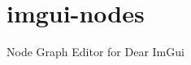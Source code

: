 \chapter{imgui-\/nodes}
\hypertarget{md__r_e_a_d_m_e}{}\label{md__r_e_a_d_m_e}
\label{md__r_e_a_d_m_e_autotoc_md0}%
%
Node Graph Editor for Dear Im\+Gui 